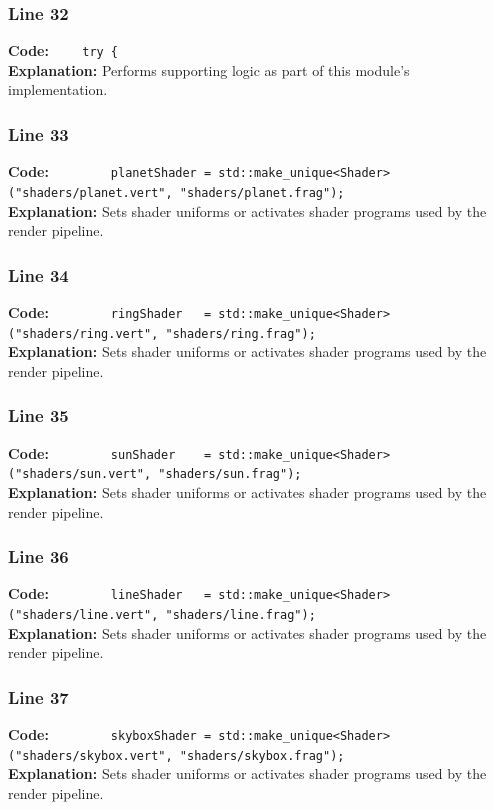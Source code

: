 \documentclass[11pt,a4paper]{article}
\begin{document}
\subsubsection*{Line 32}
\textbf{Code:} \verb|    try {|\\
\textbf{Explanation:} Performs supporting logic as part of this module's implementation.

\subsubsection*{Line 33}
\textbf{Code:} \verb|        planetShader = std::make_unique<Shader>("shaders/planet.vert", "shaders/planet.frag");|\\
\textbf{Explanation:} Sets shader uniforms or activates shader programs used by the render pipeline.

\subsubsection*{Line 34}
\textbf{Code:} \verb|        ringShader   = std::make_unique<Shader>("shaders/ring.vert", "shaders/ring.frag");|\\
\textbf{Explanation:} Sets shader uniforms or activates shader programs used by the render pipeline.

\subsubsection*{Line 35}
\textbf{Code:} \verb|        sunShader    = std::make_unique<Shader>("shaders/sun.vert", "shaders/sun.frag");|\\
\textbf{Explanation:} Sets shader uniforms or activates shader programs used by the render pipeline.

\subsubsection*{Line 36}
\textbf{Code:} \verb|        lineShader   = std::make_unique<Shader>("shaders/line.vert", "shaders/line.frag");|\\
\textbf{Explanation:} Sets shader uniforms or activates shader programs used by the render pipeline.

\subsubsection*{Line 37}
\textbf{Code:} \verb|        skyboxShader = std::make_unique<Shader>("shaders/skybox.vert", "shaders/skybox.frag");|\\
\textbf{Explanation:} Sets shader uniforms or activates shader programs used by the render pipeline.
\end{document}
